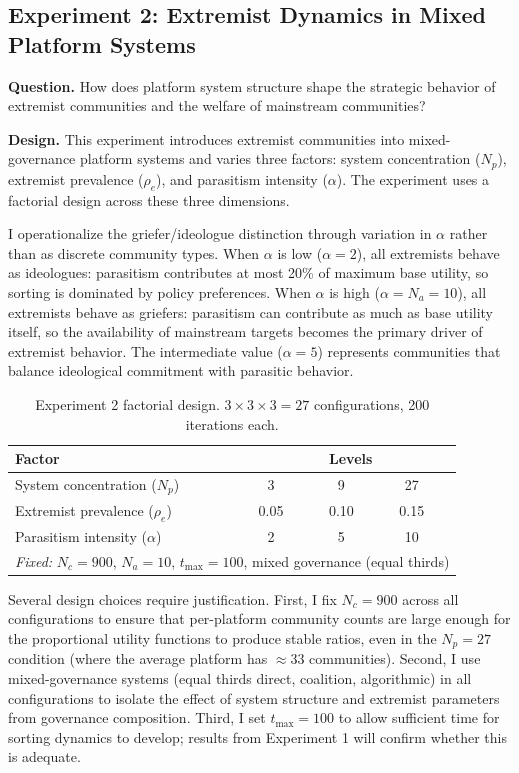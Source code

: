 \documentclass[12pt]{article}
\begin{document}
\subsection{Experiment 2: Extremist Dynamics in Mixed Platform Systems}
\label{sec:exp2}

\textbf{Question.} How does platform system structure shape the strategic behavior of extremist communities and the welfare of mainstream communities?

\textbf{Design.} This experiment introduces extremist communities into mixed-governance platform systems and varies three factors: system concentration ($N_p$), extremist prevalence ($\rho_e$), and parasitism intensity ($\alpha$). The experiment uses a factorial design across these three dimensions.

I operationalize the griefer/ideologue distinction through variation in $\alpha$ rather than as discrete community types. When $\alpha$ is low ($\alpha = 2$), all extremists behave as ideologues: parasitism contributes at most 20\% of maximum base utility, so sorting is dominated by policy preferences. When $\alpha$ is high ($\alpha = N_a = 10$), all extremists behave as griefers: parasitism can contribute as much as base utility itself, so the availability of mainstream targets becomes the primary driver of extremist behavior. The intermediate value ($\alpha = 5$) represents communities that balance ideological commitment with parasitic behavior.

\begin{table}[h]
\centering
\begin{tabular}{lcccccc}
\hline
\textbf{Factor} & \multicolumn{6}{c}{\textbf{Levels}} \\
\hline \hline
System concentration ($N_p$) & 3 & & 9 & & 27 & \\
Extremist prevalence ($\rho_e$) & 0.05 & & 0.10 & & 0.15 & \\
Parasitism intensity ($\alpha$) & 2 & & 5 & & 10 & \\
\hline
\multicolumn{7}{l}{\textit{Fixed:} $N_c = 900$, $N_a = 10$, $t_{\max} = 100$, mixed governance (equal thirds)} \\
\hline
\end{tabular}
\caption{Experiment 2 factorial design. $3 \times 3 \times 3 = 27$ configurations, 200 iterations each.}
\label{tab:exp2_config}
\end{table}

Several design choices require justification. First, I fix $N_c = 900$ across all configurations to ensure that per-platform community counts are large enough for the proportional utility functions to produce stable ratios, even in the $N_p = 27$ condition (where the average platform has $\approx 33$ communities). Second, I use mixed-governance systems (equal thirds direct, coalition, algorithmic) in all configurations to isolate the effect of system structure and extremist parameters from governance composition. Third, I set $t_{\max} = 100$ to allow sufficient time for sorting dynamics to develop; results from Experiment 1 will confirm whether this is adequate. 
\end{document}
